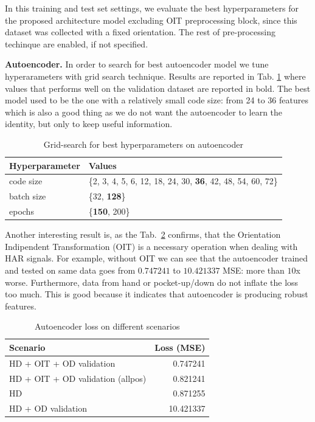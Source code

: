In this training and test set settings, we evaluate the best
hyperparameters for the proposed architecture model excluding OIT
preprocessing block, since this dataset was collected with a fixed
orientation. The rest of pre-processing techinque are enabled, if not
specified.

\textbf{Autoencoder.}  In order to search for best autoencoder model
we tune hyperarameters with grid search technique. Results are
reported in Tab. \ref{tab:ae-hyperparams} where values that performs
well on the validation dataset are reported in bold.  The best model
used to be the one with a relatively small code size: from 24 to 36
features which is also a good thing as we do not want the autoencoder
to learn the identity, but only to keep useful information.
\begin{table}[H]
  \centering
  \begin{tabular}{lp{4cm}}
    \hline
    Hyperparameter & Values \\
    \hline
    code size & \{2, 3, 4, 5, 6, 12, 18, 24, 30, \textbf{36}, 42, 48, 54, 60, 72\} \\
    batch size & \{32, \textbf{128}\} \\
    epochs & \{\textbf{150}, 200\} \\
    \hline
  \end{tabular}
  \caption{Grid-search for best hyperparameters on autoencoder}
  \label{tab:ae-hyperparams}
\end{table}

Another interesting result is, as the Tab.~\ref{tab:ae-loss} confirms,
that the Orientation Indipendent Transformation (OIT) is a necessary
operation when dealing with HAR signals. For example, without OIT we
can see that the autoencoder trained and tested on same data goes from
$0.747241$ to $10.421337$ MSE: more than $10$x worse. Furthermore,
data from hand or pocket-up/down do not inflate the loss too
much. This is good because it indicates that autoencoder is producing
robust features.
\begin{table}[H]
  \centering
  \begin{tabular}{lr}
    \hline
    Scenario & Loss (MSE) \\
    \hline
    HD + OIT + OD validation & 0.747241 \\
    HD + OIT + OD validation (allpos) & 0.821241 \\
    HD & 0.871255 \\
    HD + OD validation & 10.421337 \\
    \hline
  \end{tabular}
  \caption{Autoencoder loss on different scenarios}
  \label{tab:ae-loss}
\end{table}

